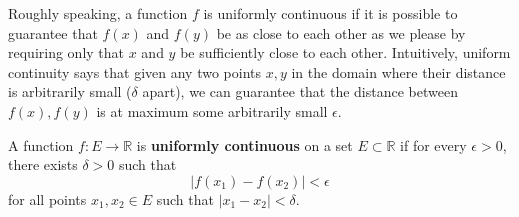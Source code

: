   Roughly speaking, a function $f$ is uniformly continuous if it is possible to guarantee that $f(x)$ and $f(y)$ be as close to each other as we please by requiring only that $x$ and $y$ be sufficiently close to each other. Intuitively, uniform continuity says that given any two points $x, y$ in the domain where their distance is arbitrarily small ($\delta$ apart), we can guarantee that the distance between $f(x), f(y)$ is at maximum some arbitrarily small $\epsilon$. 

  \begin{definition}
    A function $f: E \longrightarrow \mathbb{R}$ is \textbf{uniformly continuous} on a set $E \subset \mathbb{R}$ if for every $\epsilon > 0$, there exists $\delta > 0$ such that 
    \begin{equation}
      \big| f(x_1) - f(x_2)\big| < \epsilon
    \end{equation}
    for all points $x_1, x_2 \in E$ such that $|x_1 - x_2| < \delta$. 
  \end{definition}

